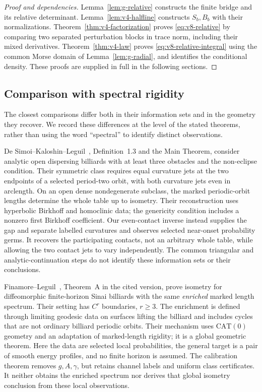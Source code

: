 \begin{proof}[Proof and dependencies]
Lemma~\ref{lem:g-relative} constructs the finite bridge and its relative
determinant. Lemma~\ref{lem:v4-halfline} constructs $S_b,B_b$ with their
normalizations. Theorem~\ref{thm:v4-factorization} proves
\eqref{eq:v8-relative} by comparing two separated perturbation blocks in
trace norm, including their mixed derivatives. Theorem~\ref{thm:v4-law}
proves \eqref{eq:v8-relative-integral} using the common Morse domain of
Lemma~\ref{lem:g-radial}, and identifies the conditional density.
These proofs are supplied in full in the following sections.
\end{proof}

\subsection{Comparison with spectral rigidity}
\label{sec:v13-literature}
The closest comparisons differ both in their information sets and in
the geometry they recover. We record these differences at the level
of the stated theorems, rather than using the word ``spectral'' to
identify distinct observations.

De Simoi--Kaloshin--Leguil~\cite{DSKL}, Definition~1.3 and the Main
Theorem, consider analytic open dispersing billiards with at least
three obstacles and the non-eclipse condition. Their symmetric class
requires equal curvature jets at the two endpoints of a selected
period-two orbit, with both curvature jets even in arclength. On an
open dense nondegenerate subclass, the marked periodic-orbit lengths
determine the whole table up to isometry. Their reconstruction uses
hyperbolic Birkhoff and homoclinic data; the genericity condition includes
a nonzero first Birkhoff coefficient. Our even-contact inverse instead
supplies the gap and separate labelled curvatures and observes selected
near-onset probability germs. It recovers the participating contacts,
not an arbitrary whole table, while allowing the two contact jets to
vary independently. The common triangular and analytic-continuation
steps do not identify these information sets or their conclusions.

Finamore--Leguil~\cite{FinamoreLeguil}, Theorem~A in the cited version,
prove isometry for diffeomorphic finite-horizon Sinai billiards with
the same \emph{enriched} marked length spectrum. Their setting has
$C^r$ boundaries, $r\ge3$. The enrichment is defined through limiting
geodesic data on surfaces lifting the billiard and includes cycles
that are not ordinary billiard periodic orbits. Their mechanism uses
$\mathrm{CAT}(0)$ geometry and an adaptation of marked-length rigidity;
it is a global geometric theorem. Here the data are selected local
probabilities, the general target is a pair of smooth energy profiles,
and no finite horizon is assumed. The calibration theorem removes
$g,A,\gamma$, but retains channel labels and uniform class certificates.
It neither obtains the enriched spectrum nor derives that global
isometry conclusion from these local observations.

